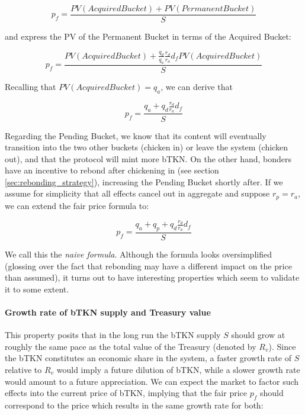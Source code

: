 \documentclass{article}
\begin{document}
\begin{equation}
  \label{eq:naive-1}
    p_f = \frac{PV(AcquiredBucket) + PV(PermanentBucket)}{S}
\end{equation}

and express the PV of the Permanent Bucket in terms of the Acquired Bucket:

\begin{equation}
  \label{eq:naive-2}
   p_f = \frac{PV(AcquiredBucket) + \frac{q_d}{q_a} \frac{r_d}{r_a} d_f PV(AcquiredBucket)}{S}
\end{equation}

Recalling that $PV(AcquiredBucket) = q_a$, we can derive that

\begin{equation}
  \label{eq:naive-3}
   p_f = \frac{q_a + q_d \frac{r_d}{r_a} d_f}{S}
\end{equation}

Regarding the Pending Bucket, we know that its content will eventually transition into the two other buckets (chicken in) or leave the system (chicken out), and that the protocol will mint more bTKN. On the other hand, bonders have an incentive to rebond after chickening in (see section \ref{sec:rebonding_strategy}), increasing the Pending Bucket shortly after. If we assume for simplicity that all effects cancel out in aggregate and suppose $r_p = r_a$, we can extend the fair price formula to:

\begin{equation}
  \label{eq:naive-4}
   p_f = \frac{q_a + q_p + q_d \frac{r_d}{r_a} d_f}{S}
\end{equation}

We call this the \textit{naive formula}. Although the formula looks oversimplified (glossing over the fact that rebonding may have a different impact on the price than assumed), it turns out to have interesting properties which seem to validate it to some extent.

\paragraph{Growth rate of bTKN supply and Treasury value}
This property posits that in the long run the bTKN supply $S$ should grow at roughly the same pace as the total value of the Treasury (denoted by $R_v$). Since the bTKN constitutes an economic share in the system, a faster growth rate of $S$ relative to $R_v$ would imply a future dilution of bTKN, while a slower growth rate would amount to a future appreciation. We can expect the market to factor such effects into the current price of bTKN, implying that the fair price $p_f$ should correspond to the price which results in the same growth rate for both:
\end{document}

